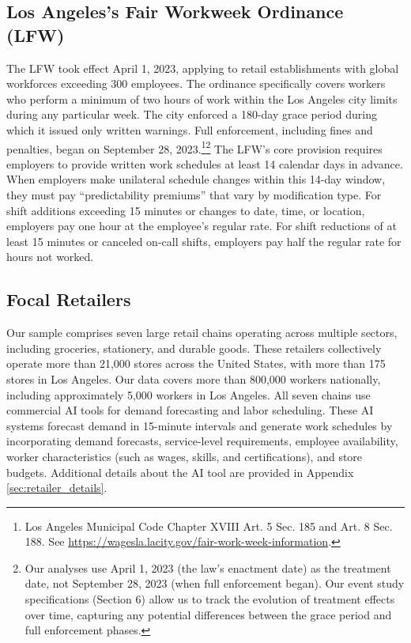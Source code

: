 \documentclass[letterpaper,11pt,leqno]{article}
\theoremstyle{paper}
\begin{document}
\subsection{Los Angeles's Fair Workweek Ordinance (LFW)} \label{subsec:losangeles_fw_intro}
The LFW took effect April 1, 2023, applying to retail establishments with global workforces exceeding 300 employees. The ordinance specifically covers workers who perform a minimum of two hours of work within the Los Angeles city limits during any particular week. The city enforced a 180-day grace period during which it issued only written warnings. Full enforcement, including fines and penalties, began on September 28, 2023.\footnote{Los Angeles Municipal Code Chapter XVIII Art. 5 Sec. 185 and Art. 8 Sec. 188. See \url{https://wagesla.lacity.gov/fair-work-week-information}.}\footnote{Our analyses use April 1, 2023 (the law's enactment date) as the treatment date, not September 28, 2023 (when full enforcement began). Our event study specifications (Section 6) allow us to track the evolution of treatment effects over time, capturing any potential differences between the grace period and full enforcement phases.} The LFW's core provision requires employers to provide written work schedules at least 14 calendar days in advance. When employers make unilateral schedule changes within this 14-day window, they must pay ``predictability premiums'' that vary by modification type. For shift additions exceeding 15 minutes or changes to date, time, or location, employers pay one hour at the employee's regular rate. For shift reductions of at least 15 minutes or canceled on-call shifts, employers pay half the regular rate for hours not worked. 


\subsection{Focal Retailers} \label{subsec:focal_retailers}
Our sample comprises seven large retail chains operating across multiple sectors, including groceries, stationery, and durable goods. These retailers collectively operate more than 21,000 stores across the United States, with more than 175 stores in Los Angeles. Our data covers more than 800,000 workers nationally, including approximately 5,000 workers in Los Angeles. All seven chains use commercial AI tools for demand forecasting and labor scheduling. These AI systems forecast demand in 15-minute intervals and generate work schedules by incorporating demand forecasts, service-level requirements, employee availability, worker characteristics (such as wages, skills, and certifications), and store budgets. Additional details about the AI tool are provided in Appendix \ref{sec:retailer_details}. 
\end{document}
